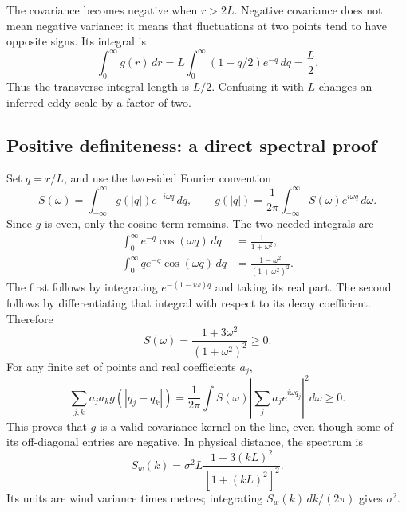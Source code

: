 \documentclass[11pt,a4paper]{article}
\numberwithin{equation}{section}
\begin{document}
The covariance becomes negative when $r>2L$. Negative covariance does not mean negative variance: it means that fluctuations at two points tend to have opposite signs. Its integral is
\begin{equation}
 \int_0^\infty g(r)\,dr=L\int_0^\infty (1-q/2)e^{-q}\,dq=\frac L2.
\end{equation}
Thus the transverse integral length is $L/2$. Confusing it with $L$ changes an inferred eddy scale by a factor of two.

\subsection{Positive definiteness: a direct spectral proof}
Set $q=r/L$, and use the two-sided Fourier convention
\begin{equation}
 S(\omega)=\int_{-\infty}^{\infty}g(|q|)e^{-i\omega q}\,dq,
 \qquad g(|q|)=\frac1{2\pi}\int_{-\infty}^{\infty}S(\omega)e^{i\omega q}\,d\omega.
\end{equation}
Since $g$ is even, only the cosine term remains. The two needed integrals are
\begin{align}
 \int_0^\infty e^{-q}\cos(\omega q)\,dq&=\frac1{1+\omega^2},\\
 \int_0^\infty q e^{-q}\cos(\omega q)\,dq&=\frac{1-\omega^2}{(1+\omega^2)^2}.
\end{align}
The first follows by integrating $e^{-(1-i\omega)q}$ and taking its real part. The second follows by differentiating that integral with respect to its decay coefficient. Therefore
\begin{equation}
 \boxed{S(\omega)=\frac{1+3\omega^2}{(1+\omega^2)^2}\geq0.}
\end{equation}
For any finite set of points and real coefficients $a_j$,
\begin{equation}
 \sum_{j,k}a_j a_k g(|q_j-q_k|)
 =\frac1{2\pi}\int S(\omega)\left|\sum_j a_j e^{i\omega q_j}\right|^2 d\omega\geq0.
\end{equation}
This proves that $g$ is a valid covariance kernel on the line, even though some of its off-diagonal entries are negative. In physical distance, the spectrum is
\begin{equation}
 S_w(k)=\sigma^2 L\frac{1+3(kL)^2}{[1+(kL)^2]^2}.
\end{equation}
Its units are wind variance times metres; integrating $S_w(k)\,dk/(2\pi)$ gives $\sigma^2$.
\end{document}
